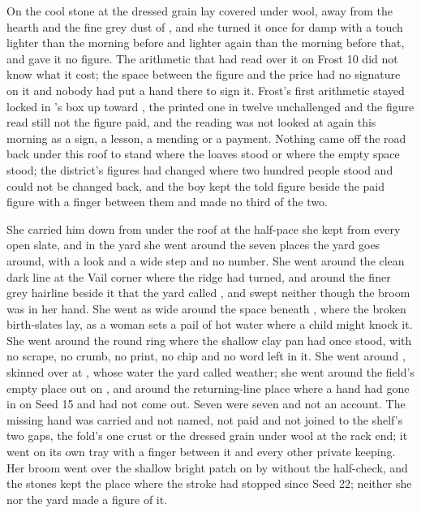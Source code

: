 On the cool stone at  the dressed grain lay covered under wool, away from the hearth and the fine grey dust of , and she turned it once for damp with a touch lighter than the morning before and lighter again than the morning before that, and gave it no figure. The arithmetic that had read over it on Frost 10 did not know what it cost; the space between the figure and the price had no signature on it and nobody had put a hand there to sign it. Frost's first arithmetic stayed locked in 's box up  toward , the printed one in twelve unchallenged and the figure read still not the figure paid, and the reading was not looked at again this morning as a sign, a lesson, a mending or a payment. Nothing came off the road back under this roof to stand where the loaves stood or where the empty space stood; the district's figures had changed where two hundred people stood and could not be changed back, and the boy kept the told figure beside the paid figure with a finger between them and made no third of the two.

She carried him down from under the roof at the half-pace she kept from every open slate, and in the yard she went around the seven places the yard goes around, with a look and a wide step and no number. She went around the clean dark line at the Vail corner where the  ridge had turned, and around the finer grey hairline beside it that the yard called , and swept neither though the broom was in her hand. She went as wide around the space beneath , where the broken birth-slates lay, as a woman sets a pail of hot water where a child might knock it. She went around the round ring where the shallow clay pan had once stood, with no scrape, no crumb, no print, no chip and no word left in it. She went around , skinned over at , whose water the yard called weather; she went around the field's empty place out on , and around the returning-line place where a hand had gone in on Seed 15 and had not come out. Seven were seven and not an account. The missing hand was carried and not named, not paid and not joined to the shelf's two gaps, the fold's one crust or the dressed grain under wool at the rack end; it went on its own tray with a finger between it and every other private keeping. Her broom went over the shallow bright patch on  by  without the half-check, and the stones kept the place where the stroke had stopped since Seed 22; neither she nor the yard made a figure of it.

